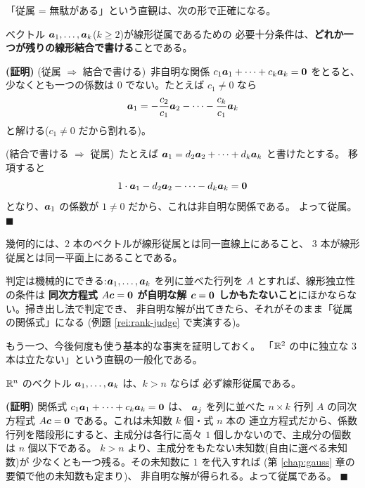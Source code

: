 「従属 = 無駄がある」という直観は、次の形で正確になる。

\begin{teiri}[従属性の言い換え]\label{thm:dep-combo}
ベクトル $\bm{a}_1, \dots, \bm{a}_k$($k \ge 2$)が線形従属であるための
必要十分条件は、\textbf{どれか一つが残りの線形結合で書ける}ことである。
\end{teiri}

\noindent\textbf{(証明)}\quad
(従属 $\Rightarrow$ 結合で書ける)\ 非自明な関係
$c_1 \bm{a}_1 + \cdots + c_k \bm{a}_k = \bm{0}$ をとると、
少なくとも一つの係数は $0$ でない。たとえば $c_1 \neq 0$ なら
\[
\bm{a}_1 = -\frac{c_2}{c_1}\bm{a}_2 - \cdots - \frac{c_k}{c_1}\bm{a}_k
\]
と解ける($c_1 \neq 0$ だから割れる)。

(結合で書ける $\Rightarrow$ 従属)\ たとえば
$\bm{a}_1 = d_2 \bm{a}_2 + \cdots + d_k \bm{a}_k$ と書けたとする。
移項すると
\[
1 \cdot \bm{a}_1 - d_2 \bm{a}_2 - \cdots - d_k \bm{a}_k = \bm{0}
\]
となり、$\bm{a}_1$ の係数が $1 \neq 0$ だから、これは非自明な関係である。
よって従属。 $\blacksquare$

幾何的には、$2$ 本のベクトルが線形従属とは同一直線上にあること、
$3$ 本が線形従属とは同一平面上にあることである。

判定は機械的にできる:$\bm{a}_1, \dots, \bm{a}_k$ を列に並べた行列を
$A$ とすれば、線形独立性の条件は
\textbf{同次方程式 $A\bm{c} = \bm{0}$ が自明な解 $\bm{c} = \bm{0}$
しかもたないこと}にほかならない。掃き出し法で判定でき、
非自明な解が出てきたら、それがそのまま「従属の関係式」になる
(例題 \ref{rei:rank-judge} で実演する)。

もう一つ、今後何度も使う基本的な事実を証明しておく。
「$\mathbb{R}^2$ の中に独立な $3$ 本は立たない」という直観の一般化である。

\begin{teiri}[本数が次元を超えれば従属]\label{thm:toomany}
$\mathbb{R}^n$ のベクトル $\bm{a}_1, \dots, \bm{a}_k$ は、$k > n$ ならば
必ず線形従属である。
\end{teiri}

\noindent\textbf{(証明)}\quad
関係式 $c_1\bm{a}_1 + \cdots + c_k\bm{a}_k = \bm{0}$ は、
$\bm{a}_j$ を列に並べた $n \times k$ 行列 $A$ の同次方程式
$A\bm{c} = \bm{0}$ である。これは未知数 $k$ 個・式 $n$ 本の
連立方程式だから、係数行列を階段形にすると、主成分は各行に高々
$1$ 個しかないので、主成分の個数は $n$ 個以下である。
$k > n$ より、主成分をもたない未知数(自由に選べる未知数)が
少なくとも一つ残る。その未知数に $1$ を代入すれば
(第 \ref{chap:gauss} 章の要領で他の未知数も定まり)、
非自明な解が得られる。よって従属である。 $\blacksquare$

